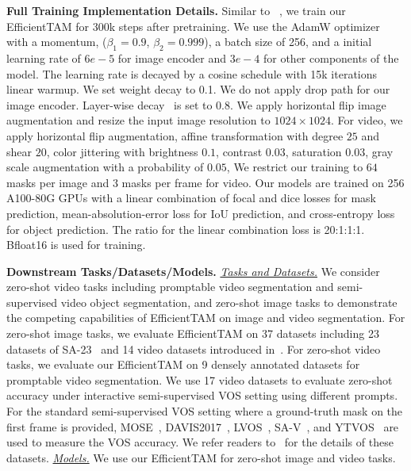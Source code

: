 \noindent \textbf{Full Training Implementation Details.} Similar to  ~\citep{ravi2024sam}, we train our EfficientTAM for 300k steps after pretraining. We use the AdamW optimizer ~\citep{loshchilov2017decoupled} with a momentum, ($\beta_1 = 0.9$, $\beta_2 = 0.999$), a batch size of 256, and a initial learning rate of $6e-5$ for image encoder and $3e-4$ for other components of the model. The learning rate is decayed by a cosine schedule with 15k iterations linear warmup. We set weight decay to 0.1. We do not apply drop path for our image encoder. Layer-wise decay~\citep{clark2020electra} is set to 0.8. We apply horizontal flip image augmentation and resize the input image resolution to $1024\times 1024$. For video, we apply horizontal flip augmentation, affine transformation with degree $25$ and shear $20$, color jittering with brightness $0.1$, contrast $0.03$, saturation $0.03$, gray scale augmentation with a probability of $0.05$, We restrict our training to $64$ masks per image and $3$ masks per frame for video. Our models are trained on 256 A100-80G GPUs with a linear combination of focal and dice losses for mask prediction, mean-absolution-error loss for IoU prediction, and cross-entropy loss for object prediction. The ratio for the linear combination loss is 20:1:1:1. Bfloat16 is used for training.

\noindent \textbf{Downstream Tasks/Datasets/Models.} \underline{\textit{Tasks and Datasets.}} We consider zero-shot video tasks including promptable video segmentation and semi-supervised video object segmentation, and zero-shot image tasks to demonstrate the competing capabilities of EfficientTAM on image and video segmentation.
For zero-shot image tasks, we evaluate EfficientTAM on 37 datasets including 23 datasets of SA-23~\citep{kirillov2023segment} and 14 video datasets introduced in~\citep{ravi2024sam}. For zero-shot video tasks, we evaluate our EfficientTAM on 9 densely annotated datasets for promptable video segmentation. We use 17 video datasets to evaluate zero-shot accuracy under interactive semi-supervised VOS setting using different prompts. For the standard semi-supervised VOS setting where a ground-truth mask on the first frame is provided, MOSE~\citep{ding2023mose}, DAVIS2017~\citep{pont20172017}, LVOS~\citep{hong2024lvos}, SA-V~\citep{ravi2024sam}, and YTVOS~\citep{xu2018youtube} are used to measure the VOS accuracy. We refer readers to~\citep{kirillov2023segment,ravi2024sam} for the details of these datasets.
\underline{\textit{Models.}} We use our EfficientTAM for zero-shot image and video tasks.

